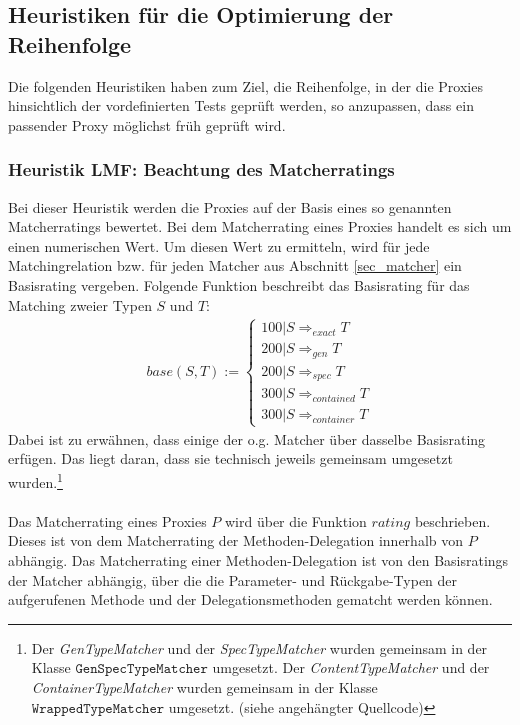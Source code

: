 \subsection{Heuristiken für die Optimierung der Reihenfolge}
Die folgenden Heuristiken haben zum Ziel, die Reihenfolge, in der die Proxies hinsichtlich der vordefinierten Tests geprüft werden, so anzupassen, dass ein passender Proxy möglichst früh geprüft wird.


\subsubsection{Heuristik LMF: Beachtung des Matcherratings}
Bei dieser Heuristik werden die Proxies auf der Basis eines so genannten Matcherratings bewertet. Bei dem Matcherrating eines Proxies handelt es sich um einen numerischen Wert. Um diesen Wert zu ermitteln, wird für jede Matchingrelation bzw. für jeden Matcher aus Abschnitt \ref{sec_matcher} ein Basisrating vergeben. Folgende Funktion beschreibt das Basisrating für das Matching zweier Typen $S$ und $T$:
\begin{gather*}
\mathit{base(S,T)} :=  \left\{ 
				\begin{array}{l}
					100 | S \Rightarrow_{exact}  T  \\
					200 | S \Rightarrow_{gen}  T  \\
					200 | S \Rightarrow_{spec}  T  \\
					300 | S \Rightarrow_{contained}  T   \\
					300 | S \Rightarrow_{container}  T  				
				\end{array}             
	\right.
\end{gather*}
\noindent
Dabei ist zu erwähnen, dass einige der o.g. Matcher über dasselbe Basisrating erfügen. Das liegt daran, dass sie technisch jeweils gemeinsam umgesetzt wurden.\footnote{Der \emph{GenTypeMatcher} und der \emph{SpecTypeMatcher} wurden gemeinsam in der Klasse $\texttt{GenSpecTypeMatcher}$ umgesetzt. Der \emph{ContentTypeMatcher} und der \emph{ContainerTypeMatcher} wurden gemeinsam in der Klasse $\texttt{WrappedTypeMatcher}$ umgesetzt. (siehe angehängter Quellcode)}
\\\\
Das Matcherrating eines Proxies $P$ wird über die Funktion $\mathit{rating}$ beschrieben. Dieses ist von dem Matcherrating der Methoden-Delegation innerhalb von $P$ abhängig. Das Matcherrating einer Methoden-Delegation ist von den Basisratings der Matcher abhängig, über die die Parameter- und Rückgabe-Typen der aufgerufenen Methode und der Delegationsmethoden gematcht werden können. 
